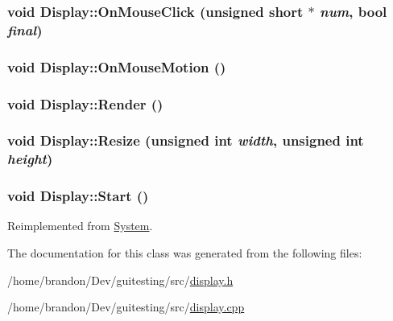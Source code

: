\hypertarget{class_display_f72a499b8bc89ac50b41c7a1830e26f0}{
\subsubsection[{OnMouseClick}]{\setlength{\rightskip}{0pt plus 5cm}void Display::OnMouseClick (unsigned short $\ast$ {\em num}, \/  bool {\em final})}}
\label{class_display_f72a499b8bc89ac50b41c7a1830e26f0}


\hypertarget{class_display_1fe61057339c7f82a6a1d918d3ff619f}{
\subsubsection[{OnMouseMotion}]{\setlength{\rightskip}{0pt plus 5cm}void Display::OnMouseMotion ()}}
\label{class_display_1fe61057339c7f82a6a1d918d3ff619f}


\hypertarget{class_display_72ec5b5207fbac8f5930b941714c8981}{
\subsubsection[{Render}]{\setlength{\rightskip}{0pt plus 5cm}void Display::Render ()}}
\label{class_display_72ec5b5207fbac8f5930b941714c8981}


\hypertarget{class_display_a4d2ba3e82a44746ccfe827effa8eec6}{
\subsubsection[{Resize}]{\setlength{\rightskip}{0pt plus 5cm}void Display::Resize (unsigned int {\em width}, \/  unsigned int {\em height})}}
\label{class_display_a4d2ba3e82a44746ccfe827effa8eec6}


\hypertarget{class_display_b811555d7bb26dba257ec5e7924788d9}{
\subsubsection[{Start}]{\setlength{\rightskip}{0pt plus 5cm}void Display::Start ()}}
\label{class_display_b811555d7bb26dba257ec5e7924788d9}




Reimplemented from \hyperlink{class_system_99d3c3036a58c1698f286677c4ace286}{System}.

The documentation for this class was generated from the following files:\begin{CompactItemize}
\item 
/home/brandon/Dev/guitesting/src/\hyperlink{display_8h}{display.h}\item 
/home/brandon/Dev/guitesting/src/\hyperlink{display_8cpp}{display.cpp}\end{CompactItemize}
